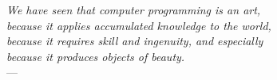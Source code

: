 
\begin{flushright}{\slshape
    We have seen that computer programming is an art, \\
    because it applies accumulated knowledge to the world, \\
    because it requires skill and ingenuity, and especially \\
    because it produces objects of beauty.} \\ \medskip
    ---  \citep{knuth:1974}
\end{flushright} 



\bigskip

\begingroup
\let\clearpage\relax
\let\cleardoublepage\relax
\let\cleardoublepage\relax
